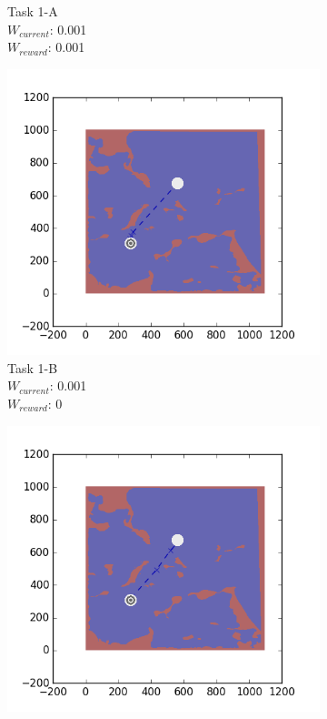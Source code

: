 \documentclass{tamuccthesis}
\begin{document}
\begin{figure}[H]
\begin{subfigure}[b]{0.24\textwidth}
        \caption{{\small Task 1-A \\ $W_{current}$: 0.001 \\ $W_{reward}$: 0.001}}
        \label{fig:Path_1-A_upCurrent_Reward}
    \end{subfigure}
    \begin{subfigure}[b]{0.24\textwidth}
        \centering
        \includegraphics[width=\textwidth,trim={4cm 3cm 2cm 3cm},clip]{EXP3RG_PathAb_-1_-1_0d001_0.png}
        \caption{{\small Task 1-B \\ $W_{current}$: 0.001 \\ $W_{reward}$: 0}}
        \label{fig:Path_1-B_upCurrent_noReward}
    \end{subfigure}
    \begin{subfigure}[b]{0.24\textwidth}  
        \centering 
        \includegraphics[width=\textwidth,trim={4cm 3cm 2cm 3cm},clip]{EXP3RG_PathAb_-1_-1_0d001_-1.png}

\end{subfigure}
\end{figure}
\end{document}
